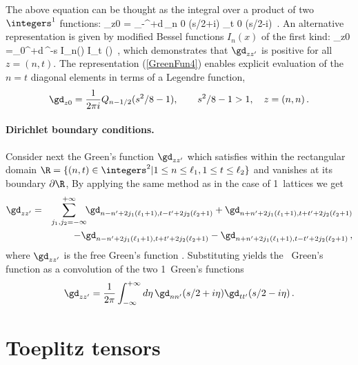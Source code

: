 The above equation can be thought as the integral over a product of two
$\integers^1$ functions:
\beq
 \gd_{z0} =
 \int_{-\infty}^{+\infty}d\eta\,\gd_{n 0} (s/2+i\eta) \gd_{t 0} (s/2-i\eta)
\,.
An alternative representation is given by modified Bessel
functions $I_n(x)$ of the first kind:
\beq
\gd_{z0} =\int_{0}^{+\infty}d\eta\,\e^{-s\eta} I_n(\eta) I_t (\eta)
\,,
which demonstrates that $ \gd_{z z'}$ is
positive for all $z=(n,t)$.
The representation (\ref{GreenFun4})
enables explicit evaluation of the $n=t$ diagonal elements
in terms of a Legendre function, %
\[
 \gd_{z0}=\frac{1}{2\pi i}Q_{n-1/2}(s^2/8-1 ),\qquad  s^2/8-1 >1, \quad z=(n,n)
 \,.
\]

\paragraph{Dirichlet boundary conditions.}
Consider next the Green's function $\gd_{zz'}$
which  satisfies
 within the rectangular domain
\(
\R=\{ (n,t) \in
\integers^2 |1 \leq n\leq \ell_1 , 1 \leq t\leq \ell_2    \}
\)
and vanishes at its boundary $\partial \R$, %
By applying the same method as in the case of 1\dmn\ lattices we  get
\begin{eqnarray*}
\gd_{zz'}
&=&\sum_{j_1,j_2=-\infty}^{+\infty}\!\!
\gd_{n-n'+2j_1(\ell_1+1), t-t'+2j_2(\ell_2+1)} +
\gd_{n+n'+2j_1(\ell_1+1),t+t'+2j_2(\ell_2+1)}\\
& &\qquad -\gd_{n-n'+2j_1(\ell_1+1), t+t'+2j_2(\ell_2+1)}
  -\gd_{n+n'+2j_1(\ell_1+1),t-t'+2j_2(\ell_2+1)}
\,,
\end{eqnarray*}
where $\gd_{zz'}$ is the free Green's function .
Substituting   yields
the \spt\ Green's function as a convolution of the two 1\dmn\
Green's functions 
\begin{equation}
 \gd_{z z'}  =\frac{1}{2\pi}\int_{-\infty}^{+\infty}d\eta\,
              \gd_{nn'}(s/2+i\eta)  \gd_{tt'}(s/2-i\eta)
\,.
\label{DirGreenFun1}
\end{equation}


\section{Toeplitz tensors}
\label{sect:Green2d}

